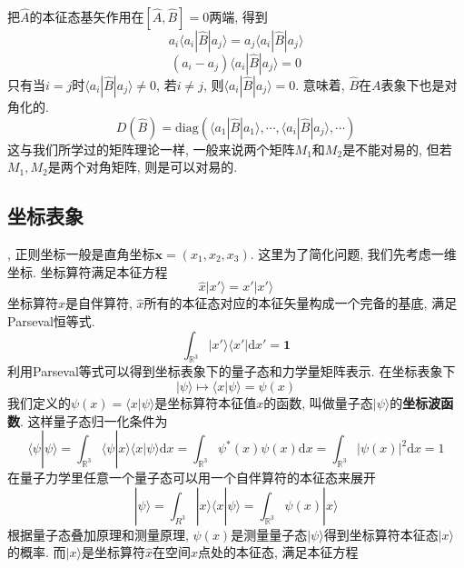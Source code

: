 \documentclass[a4paper,11pt]{book}
\newcommand{\A}{\hat{A}}
\newcommand{\B}{\hat{B}}
\newcommand{\md}{\mathrm{d}}
\newcommand{\x}{\hat{x}}
\begin{document}
把$\A$的本征态基矢作用在$[\A,\B]=0$两端, 得到
\begin{equation*}
  a_i\langle a_i|\B|a_j\rangle=a_j\langle a_i|\B|a_j\rangle
\end{equation*}
\begin{equation*}
  (a_i-a_j)\langle a_i|\B|a_j\rangle=0
\end{equation*}
只有当$i=j$时$\langle a_i|\B|a_j\rangle\neq0$, 若$i\neq j$, 则$\langle a_i|\B|a_j\rangle=0$. 意味着, $\B$在$A$表象下也是对角化的.
\begin{equation*}
  D(\B)=\mathrm{diag}(\langle a_1|\B|a_1\rangle,\cdots,\langle a_i|\B|a_j\rangle,\cdots)
\end{equation*}
这与我们所学过的矩阵理论一样, 一般来说两个矩阵$M_1$和$M_2$是不能对易的, 但若$M_1,M_2$是两个对角矩阵, 则是可以对易的.
\subsection{坐标表象}
, 正则坐标一般是直角坐标$\mathbf{x}=(x_1,x_2,x_3)$. 这里为了简化问题, 我们先考虑一维坐标. 坐标算符满足本征方程
\begin{equation*}
  \x|x'\rangle=x'|x'\rangle
\end{equation*}
坐标算符$\x$是自伴算符, $\x$所有的本征态对应的本征矢量构成一个完备的基底, 满足Parseval恒等式.
\begin{equation*}
  \int_{\mathbb{R}^3}|x'\rangle\langle x'|\md x'=\mathbf{1}
\end{equation*}
利用Parseval等式可以得到坐标表象下的量子态和力学量矩阵表示. 在坐标表象下
\begin{equation*}
  |\psi\rangle\longmapsto \langle x|\psi\rangle=\psi(x)
\end{equation*}
我们定义的$\psi(x)=\langle x|\psi\rangle$是坐标算符本征值$x$的函数, 叫做量子态$|\psi\rangle$的\textbf{坐标波函数}. 这样量子态归一化条件为
\begin{equation*}
  \langle\psi|\psi\rangle=\int_{\mathbb{R}^3}\langle\psi|x\rangle\langle x|\psi\rangle\md x=\int_{\mathbb{R}^3}\psi^*(x)\psi(x)\md x=\int_{\mathbb{R}^3}\left|\psi(x)\right|^2\md x=1
\end{equation*}
在量子力学里任意一个量子态可以用一个自伴算符的本征态来展开
\begin{equation*}
  |\psi\rangle=\int_{R^3}|x\rangle\langle x|\psi\rangle=\int_{\mathbb{R}^3}\psi(x)|x\rangle
\end{equation*}
根据量子态叠加原理和测量原理, $\psi(x)$是测量量子态$|\psi\rangle$得到坐标算符本征态$|x\rangle$的概率. 而$|x\rangle$是坐标算符$\x$在空间$x$点处的本征态, 满足本征方程
\end{document}
